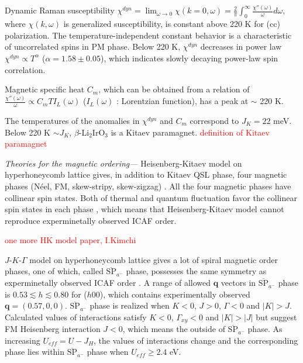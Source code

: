 Dynamic Raman susceptibility $\chi^{dyn} = \lim_{\omega \to 0}\chi(k=0, \omega) = \frac{2}{\pi}\int^\infty_0 \frac{\chi''(\omega)}{\omega} d\omega$, where $\chi(k, \omega)$ is generalized susceptibility, is constant above 220 K for (cc) polarization.
The temperature-independent constant behavior is a characteristic of uncorrelated spins in PM phase.
Below 220 K, $\chi^{dyn}$ decreases in power law $\chi^{dyn} \propto T^\alpha$ ($\alpha = 1.58\pm0.05$), which indicates slowly decaying power-law spin correlation.

Magnetic specific heat $C_m$, which can be obtained from a relation of $\frac{\chi''(\omega)}{\omega} \propto C_mTI_L(\omega)$ ($I_L(\omega)$ : Lorentzian function), has a peak at $\sim$ 220 K.

The temperatures of the anomalies in $\chi^{dyn}$ and $C_m$ correspond to $J_K = 22$ meV.
Below 220 K $\sim J_K$, $\beta$-Li$_2$IrO$_3$ is a Kitaev paramagnet.
\textcolor{red}{definition of Kitaev paramagnet}

\vspace{3mm}
\noindent\textit{Theories for the magnetic ordering---} Heisenberg-Kitaev model on hyperhoneycomb lattice gives, in addition to Kitaev QSL phase, four magnetic phases (N\'eel, FM, skew-stripy, skew-zigzag) \cite{}.
All the four magnetic phases have collinear spin states.
Both of thermal and quantum fluctuation favor the collinear spin states in each phase \cite{}, which means that Heisenberg-Kitaev model cannot reproduce experminetally observed ICAF order.

\textcolor{red}{one more HK model paper, I.Kimchi}

$J$-$K$-$\Gamma$ model on hyperhoneycomb lattice gives a lot of spiral magnetic order phases, one of which, called $\overline{\mathrm{SP}}_{a^-}$ phase, possesses the same symmetry as experminetally observed ICAF order \cite{}.
A range of allowed $\bm{q}$ vectors in $\overline{\mathrm{SP}}_{a^-}$ phase is $0.53 \lesssim h \lesssim 0.80$ for ($h00$), which contains experimentally observed $\bm{q} = (0.57, 0, 0)$.
$\overline{\mathrm{SP}}_{a^-}$ phase is realized when $K < 0$, $J > 0$, $\Gamma < 0$ and $|K| > J$.
Calculated values of interactions satisfy $K < 0$, $\Gamma_{xy} < 0$ and $|K| > |J|$ but suggest FM Heisenberg interaction $J < 0$, which means the outside of $\overline{\mathrm{SP}}_{a^-}$ phase.
As increasing $U_{eff} = U - J_H$, the values of interactions change and the corresponding phase lies within $\overline{\mathrm{SP}}_{a^-}$ phase when $U_{eff} \geq 2.4$ eV.

